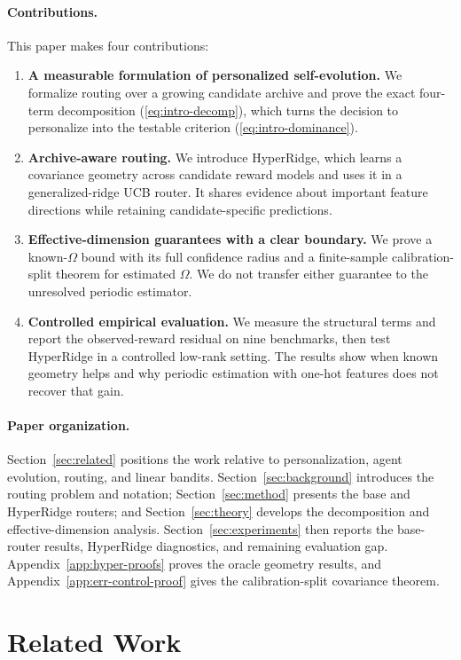 \documentclass{article} %
\renewcommand{\eqref}[1]{\textup{(\ref{#1})}}
\begin{document}
\paragraph{Contributions.}
This paper makes four contributions:
\begin{enumerate}
\item \textbf{A measurable formulation of personalized self-evolution.} We formalize routing over a growing candidate archive and prove the exact four-term decomposition \eqref{eq:intro-decomp}, which turns the decision to personalize into the testable criterion \eqref{eq:intro-dominance}.
\item \textbf{Archive-aware routing.} We introduce HyperRidge, which learns a covariance geometry across candidate reward models and uses it in a generalized-ridge UCB router. It shares evidence about important feature directions while retaining candidate-specific predictions.
\item \textbf{Effective-dimension guarantees with a clear boundary.} We prove a known-$\Omega$ bound with its full confidence radius and a finite-sample calibration-split theorem for estimated $\Omega$. We do not transfer either guarantee to the unresolved periodic estimator.
\item \textbf{Controlled empirical evaluation.} We measure the structural terms and report the observed-reward residual on nine benchmarks, then test HyperRidge in a controlled low-rank setting. The results show when known geometry helps and why periodic estimation with one-hot features does not recover that gain.
\end{enumerate}

\paragraph{Paper organization.}
Section~\ref{sec:related} positions the work relative to personalization, agent evolution, routing, and linear bandits. Section~\ref{sec:background} introduces the routing problem and notation; Section~\ref{sec:method} presents the base and HyperRidge routers; and Section~\ref{sec:theory} develops the decomposition and effective-dimension analysis. Section~\ref{sec:experiments} then reports the base-router results, HyperRidge diagnostics, and remaining evaluation gap. Appendix~\ref{app:hyper-proofs} proves the oracle geometry results, and Appendix~\ref{app:err-control-proof} gives the calibration-split covariance theorem.

\section{Related Work}
\end{document}
